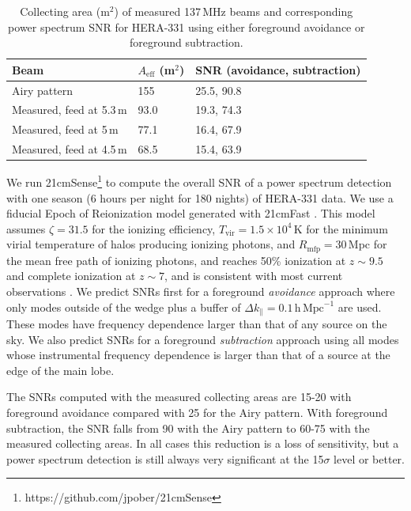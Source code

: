 \documentclass{emulateapj}
\begin{document}
 \begin{table}[h]
 \caption{ \label{table:collectingareatable}Collecting area (m$^2$) of measured 137\,MHz beams and corresponding power spectrum SNR for HERA-331 using either foreground avoidance or foreground subtraction.}
\begin{tabular}{| l | l | l |}
\hline
Beam & $A_\text{eff}$ (m$^2$) & SNR (avoidance, subtraction)\\
\hline
  Airy pattern & 155 & 25.5, 90.8  \\
    Measured, feed at 5.3\,m & 93.0 & 19.3, 74.3 \\
    Measured, feed at 5\,m & 77.1 &  16.4, 67.9 \\
    Measured, feed at 4.5\,m & 68.5 &  15.4, 63.9 \\ 
  \hline
\end{tabular}
\end{table}

We run 21cmSense\footnote{https://github.com/jpober/21cmSense} to compute the overall SNR of a power spectrum detection with one season (6 hours per night for 180 nights) of HERA-331 data. We use a fiducial Epoch of Reionization model generated with 21cmFast \citep{21cmfast}. This model assumes $\zeta=31.5$ for the ionizing efficiency, $T_\mathrm{vir}=1.5\times10^4$\,K for the minimum virial temperature of halos producing ionizing photons, and $R_\text{mfp}=30$\,Mpc for the mean free path of ionizing photons, and reaches 50\% ionization at $z \sim 9.5$ and complete ionization at $z \sim 7$, and is consistent with most current observations \citep[e.g.][]{PoberNextGen}. We predict SNRs first for a foreground \textit{avoidance} approach where only modes outside of the wedge plus a buffer of $\Delta k_\parallel=0.1\,\mathrm{h}\,\mathrm{Mpc}^{-1}$ are used. These modes have frequency dependence larger than that of any source on the sky. We also predict SNRs for a foreground \textit{subtraction} approach using all modes whose instrumental frequency dependence is larger than that of a source at the edge of the main lobe. 

The SNRs computed with the measured collecting areas are 15-20 with foreground avoidance compared with 25 for the Airy pattern. With foreground subtraction, the SNR falls from 90 with the Airy pattern to 60-75 with the measured collecting areas. In all cases this reduction is a loss of sensitivity, but a power spectrum detection is still always very significant at the 15$\sigma$ level or better.
\end{document}
